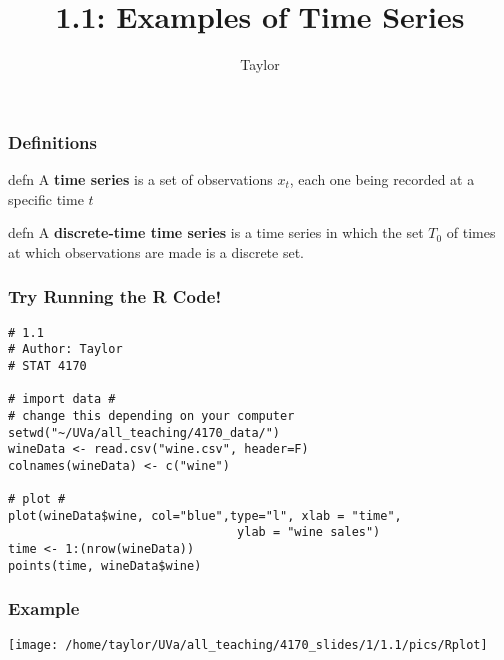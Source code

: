 \documentclass{beamer}
\title["1.1"]{1.1: Examples of Time Series}
\author{Taylor}
\institute[UVA] 
{
University of Virginia \\
\medskip
\textit{} 
}
\date{}
\begin{document}

\begin{frame}
\titlepage 
\end{frame}

\begin{frame}
\frametitle{Definitions}

\begin{block}{defn}
A {\bf time series} is a set of observations $x_t$, each one being recorded at a specific time $t$
\end{block}

\begin{block}{defn}
A {\bf discrete-time time series} is a time series in which the set $T_0$ of times at which observations are made is a discrete set.
\end{block}


\end{frame}


\begin{frame}[fragile] %
\frametitle{Try Running the R Code!}

\begin{verbatim}
# 1.1
# Author: Taylor
# STAT 4170

# import data #
# change this depending on your computer
setwd("~/UVa/all_teaching/4170_data/")
wineData <- read.csv("wine.csv", header=F)
colnames(wineData) <- c("wine")

# plot #
plot(wineData$wine, col="blue",type="l", xlab = "time", 
                                ylab = "wine sales")
time <- 1:(nrow(wineData))
points(time, wineData$wine)

\end{verbatim}

\end{frame}


\begin{frame}
\frametitle{Example}

\begin{center}
\texttt{[image: /home/taylor/UVa/all\_teaching/4170\_slides/1/1.1/pics/Rplot]}
\end{center}

\end{frame}
\end{document}
